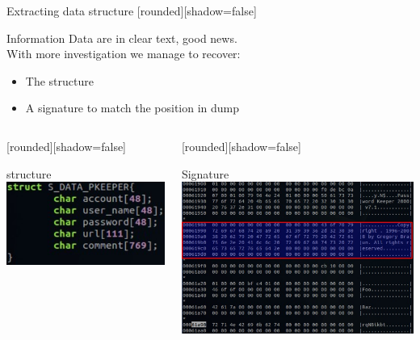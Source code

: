 \documentclass[compress]{beamer}
\begin{document}
\begin{frame}{Extracting data structure}
      [rounded][shadow=false]
      \begin{block}{Information}
Data are in clear text, good news.\\
With more investigation we manage to
recover:
        \begin{itemize}
          \item The structure
          \item A signature to match the position in dump
        \end{itemize}
      \end{block}

  \begin{columns}[T]
    \begin{column}{.4\textwidth}

      [rounded][shadow=false]
      \begin{block}{structure}
        \includegraphics[width=\textwidth]{img/passwordkeeper_struct.eps}
      \end{block}
    \end{column}
    \begin{column}{.6\textwidth}

      [rounded][shadow=false]
      \begin{block}{Signature}
        \includegraphics[scale=0.2]{img/passwordkeeper_sign.eps}
      \end{block}
    \end{column}
  \end{columns}

\end{frame}
\end{document}
